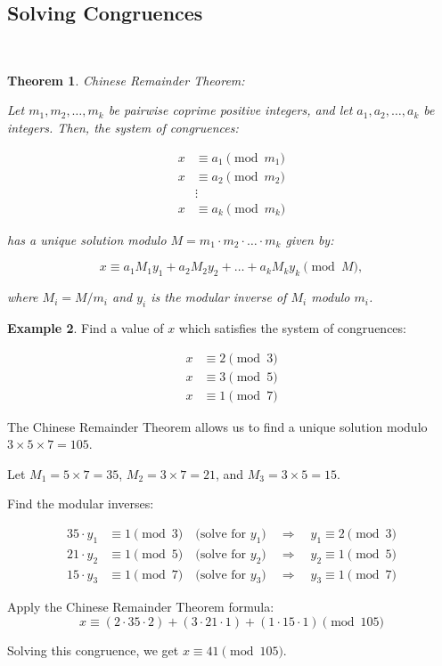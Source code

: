 \documentclass[letterpaper,10pt]{article}
\theoremstyle{plain}
\newtheorem{thm}{Theorem}[section]
\theoremstyle{definition}
\newtheorem{exmp}[thm]{Example}
\theoremstyle{remark}
\begin{document}
\subsection{Solving Congruences}$ $\\
\begin{thm}{Chinese Remainder Theorem:}


Let $m_1, m_2, \ldots, m_k$ be pairwise coprime positive integers, and let $a_1, a_2, \ldots, a_k$ be integers. Then, the system of congruences:


\begin{align*}
x &\equiv a_1 \pmod{m_1} \\
x &\equiv a_2 \pmod{m_2} \\
& \vdots \\
x &\equiv a_k \pmod{m_k}
\end{align*}


has a unique solution modulo $M = m_1 \cdot m_2 \cdot \ldots \cdot m_k$ given by:

\[
x \equiv a_1 M_1 y_1 + a_2 M_2 y_2 + \ldots + a_k M_k y_k \pmod{M},
\]

where $M_i = M/m_i$ and $y_i$ is the modular inverse of $M_i$ modulo $m_i$.

\end{thm}
\begin{exmp}
Find a value of $x$ which satisfies the system of congruences:

\begin{align*}
x &\equiv 2 \pmod{3} \\
x &\equiv 3 \pmod{5} \\
x &\equiv 1 \pmod{7}
\end{align*}


The Chinese Remainder Theorem allows us to find a unique solution modulo \(3 \times 5 \times 7 = 105\).

Let \(M_1 = 5 \times 7 = 35\), \(M_2 = 3 \times 7 = 21\), and \(M_3 = 3 \times 5 = 15\).

Find the modular inverses:

\begin{align*}
35 \cdot y_1 &\equiv 1 \pmod{3} \quad \text{(solve for \(y_1\))} \quad \Rightarrow \quad y_1 \equiv 2 \pmod{3} \\
21 \cdot y_2 &\equiv 1 \pmod{5} \quad \text{(solve for \(y_2\))} \quad \Rightarrow \quad y_2 \equiv 1 \pmod{5} \\
15 \cdot y_3 &\equiv 1 \pmod{7} \quad \text{(solve for \(y_3\))} \quad \Rightarrow \quad y_3 \equiv 1 \pmod{7}
\end{align*}


Apply the Chinese Remainder Theorem formula:
\[ x \equiv (2 \cdot 35 \cdot 2) + (3 \cdot 21 \cdot 1) + (1 \cdot 15 \cdot 1) \pmod{105} \]

Solving this congruence, we get \(x \equiv 41 \pmod{105}\).
\end{exmp}
\end{document}
